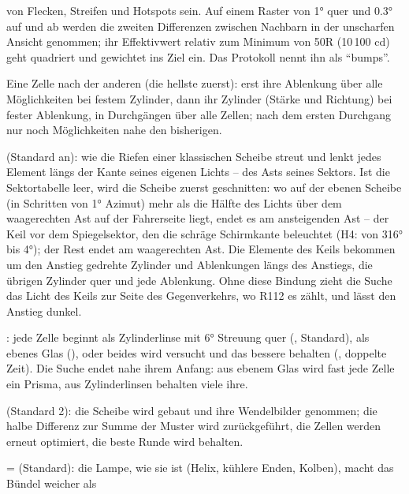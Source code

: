 \begin{description}
    von Flecken, Streifen und Hotspots sein. Auf einem Raster von \ang{1} quer und \ang{0.3} auf und ab
    werden die zweiten Differenzen zwischen Nachbarn in der unscharfen Ansicht genommen; ihr
    Effektivwert relativ zum Minimum von 50R (10\,100 cd) geht quadriert und gewichtet ins Ziel ein.
    Das Protokoll nennt ihn als \enquote{bumps}.
  \item[Die Suche.] Eine Zelle nach der anderen (die hellste zuerst): erst ihre Ablenkung über alle
    Möglichkeiten bei festem Zylinder, dann ihr Zylinder (Stärke und Richtung) bei fester Ablenkung, in
    Durchgängen über alle Zellen; nach dem ersten Durchgang nur noch Möglichkeiten nahe den
    bisherigen.
  \item[Entlang der Kanten.]  (Standard an): wie die Riefen einer
    klassischen Scheibe streut und lenkt jedes Element längs der Kante seines eigenen Lichts -- des
    Asts seines Sektors. Ist die Sektortabelle leer, wird die Scheibe zuerst geschnitten: wo auf der
    ebenen Scheibe (in Schritten von \ang{1} Azimut) mehr als die Hälfte des Lichts über dem
    waagerechten Ast auf der Fahrerseite liegt, endet es am ansteigenden Ast -- der Keil vor dem
    Spiegelsektor, den die schräge Schirmkante beleuchtet (H4: von \ang{316} bis \ang{4}); der Rest
    endet am waagerechten Ast. Die Elemente des Keils bekommen um den Anstieg gedrehte Zylinder und
    Ablenkungen längs des Anstiegs, die übrigen Zylinder quer und jede Ablenkung. Ohne diese Bindung
    zieht die Suche das Licht des Keils zur Seite des Gegenverkehrs, wo R112 es zählt, und lässt den
    Anstieg dunkel.
  \item[Der Start.] : jede Zelle beginnt als Zylinderlinse mit \ang{6}
    Streuung quer (, Standard), als ebenes Glas
    (), oder beides wird versucht und das bessere behalten (, doppelte Zeit). Die Suche endet nahe ihrem Anfang: aus ebenem Glas wird fast jede Zelle ein
    Prisma, aus Zylinderlinsen behalten viele ihre.
  \item[Runden.]  (Standard 2): die Scheibe wird gebaut und ihre Wendelbilder
    genommen; die halbe Differenz zur Summe der Muster wird zurückgeführt, die Zellen werden erneut
    optimiert, die beste Runde wird behalten.
  \item[Die Unschärfe der Lampe.]  = 
    (Standard): die Lampe, wie sie ist (Helix, kühlere Enden, Kolben), macht das Bündel weicher als

\end{description}

